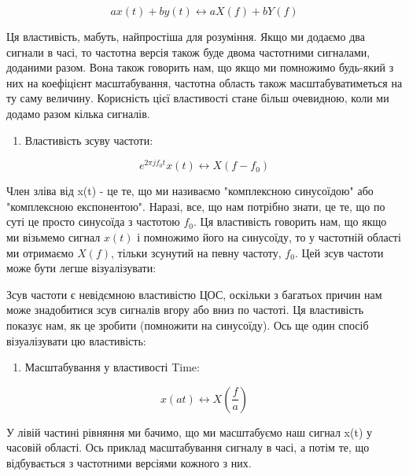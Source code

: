 \[a x(t) + b y(t) \leftrightarrow a X(f) + b Y(f)\]

Ця властивість, мабуть, найпростіша для розуміння. Якщо ми додаємо два
сигнали в часі, то частотна версія також буде двома частотними
сигналами, доданими разом. Вона також говорить нам, що якщо ми помножимо
будь-який з них на коефіцієнт масштабування, частотна область також
масштабуватиметься на ту саму величину. Корисність цієї властивості
стане більш очевидною, коли ми додамо разом кілька сигналів.

\begin{enumerate}
\def\labelenumi{\arabic{enumi}.}
\setcounter{enumi}{1}
\tightlist
\item
  Властивість зсуву частоти:
\end{enumerate}

\[e^{2 \pi j f_0 t}x(t) \leftrightarrow X(f-f_0)\]

Член зліва від x(t) - це те, що ми називаємо "комплексною синусоїдою"
або "комплексною експонентою". Наразі, все, що нам потрібно знати, це
те, що по суті це просто синусоїда з частотою \(f_0\). Ця властивість
говорить нам, що якщо ми візьмемо сигнал \(x(t)\) і помножимо його на
синусоїду, то у частотній області ми отримаємо \(X(f)\), тільки зсунутий
на певну частоту, \(f_0\). Цей зсув частоти може бути легше
візуалізувати:

\href{../_images/freq-shift.svg}{}

Зсув частоти є невід\textquotesingle ємною властивістю ЦОС, оскільки з
багатьох причин нам може знадобитися зсув сигналів вгору або вниз по
частоті. Ця властивість показує нам, як це зробити (помножити на
синусоїду). Ось ще один спосіб візуалізувати цю властивість:

\href{../_images/freq-shift-diagram.svg}{}

\begin{enumerate}
\def\labelenumi{\arabic{enumi}.}
\setcounter{enumi}{2}
\tightlist
\item
  Масштабування у властивості Time:
\end{enumerate}

\[x(at) \leftrightarrow X\left(\frac{f}{a}\right)\]

У лівій частині рівняння ми бачимо, що ми масштабуємо наш сигнал x(t) у
часовій області. Ось приклад масштабування сигналу в часі, а потім те,
що відбувається з частотними версіями кожного з них.

\href{../_images/time-scaling.svg}{}

